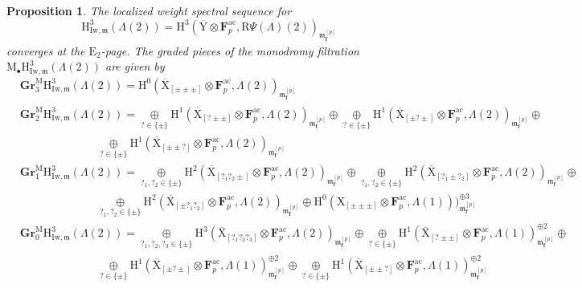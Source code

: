 \documentclass[10pt]{amsart}
\numberwithin{equation}{section}
\theoremstyle{plain}
\newtheorem{proposition}[theorem]{Proposition}
\numberwithin{equation}{section}
\theoremstyle{definition}
\theoremstyle{remark}
\def\ac{\mathrm{ac}}
\def\frakm{\mathfrak{m}}
\def\ac{\mathrm{ac}}
\def\triplef{\underline{\mathbf{f}}}
\def\frakm{\mathfrak{m}}
\def\FF{\mathbf{F}}
\def\rmH{\mathrm{H}}
\def\rmE{\mathrm{E}}
\def\rmM{\mathrm{M}}
\def\rmX{\mathrm{X}}
\def\rmXbar{\overline{\rmX}}
\def\rmY{\mathrm{Y}}
\def\rmR{\mathrm{R}}
\newcommand{\Iw}{\mathrm{Iw}}
\newcommand{\Gr}{\mathbf{Gr}}
\begin{document}
\begin{proposition}\label{WS}
The localized weight spectral sequence for 
\begin{equation*}
\rmH^{3}_{\Iw,\frakm}(\Lambda(2))=\rmH^{3}(\overline{\rmY}\otimes\FF^{\ac}_{p}, \rmR\Psi(\Lambda)(2))_{\frakm^{[p]}_{\triplef}}
\end{equation*} 
converges at the $\rmE_{2}$-page. The graded pieces of the monodromy filtration $\rmM_{\bullet}\rmH^{3}_{\Iw,\frakm}(\Lambda(2))$ are given by
\begin{equation*}
\begin{aligned}
&\Gr^{\rmM}_{3}\rmH^{3}_{\Iw,\frakm}(\Lambda(2))=\rmH^{0}(\rmXbar_{[\pm\pm\pm]}\otimes\FF^{\ac}_{p}, \Lambda(2))_{\frakm^{[p]}_{\triplef}}\\
&\Gr^{\rmM}_{2}\rmH^{3}_{\Iw,\frakm}(\Lambda(2))=\underset{?\in\{\pm\}}\oplus\rmH^{1}(\rmXbar_{[?\pm\pm]}\otimes\FF^{\ac}_{p}, \Lambda(2))_{\frakm^{[p]}_{\triplef}}\oplus \underset{?\in\{\pm\}}\oplus\rmH^{1}(\rmXbar_{[\pm?\pm]}\otimes{\FF^{\ac}_{p}}, \Lambda(2))_{\frakm^{[p]}_{\triplef}}\oplus \\
&\phantom{aaaaaaaaaaaaa}\underset{?\in\{\pm\}}\oplus\rmH^{1}(\rmXbar_{[\pm\pm?]}\otimes{\FF^{\ac}_{p}}, \Lambda(2))_{\frakm^{[p]}_{\triplef}} \\
&\Gr^{\rmM}_{1}\rmH^{3}_{\Iw,\frakm}(\Lambda(2))=\underset{?_{1}, ?_{2}\in\{\pm\}}\oplus\rmH^{2}(\rmXbar_{[?_{1}?_{2}\pm]}\otimes{\FF^{\ac}_{p}}, \Lambda(2))_{\frakm^{[p]}_{\triplef}}\oplus \underset{?_{1}, ?_{2}\in\{\pm\}}\oplus\rmH^{2}(\rmXbar_{[?_{1}\pm?_{2}]}\otimes{\FF^{\ac}_{p}}, \Lambda(2))_{\frakm^{[p]}_{\triplef}}\oplus\\
&\phantom{aaaaaaaaaaaaa}\underset{?_{1}, ?_{2}\in\{\pm\}}\oplus\rmH^{2}(\rmXbar_{[\pm?_{1}?_{2}]}\otimes{\FF^{\ac}_{p}}, \Lambda(2))_{\frakm^{[p]}_{\triplef}}\oplus\rmH^{0}(\rmX_{[\pm\pm\pm]}\otimes\FF^{\ac}_{p}, \Lambda(1)))^{\oplus 3}_{\frakm^{[p]}_{\triplef}} \\
&\Gr^{\rmM}_{0}\rmH^{3}_{\Iw,\frakm}(\Lambda(2))=\underset{?_{1}, ?_{2}, ?_{3}\in\{\pm\}}\oplus\rmH^{3}(\rmXbar_{[?_{1}?_{2}?_{3}]}\otimes{\FF^{\ac}_{p}}, \Lambda(2))_{\frakm^{[p]}_{\triplef}}\oplus \underset{?\in\{\pm\}}\oplus\rmH^{1}(\rmXbar_{[?\pm\pm]}\otimes{\FF^{\ac}_{p}}, \Lambda(1))^{\oplus2}_{\frakm^{[p]}_{\triplef}}\oplus\\
&\phantom{aaaaaaaaaaaaa}\underset{?\in\{\pm\}}\oplus\rmH^{1}(\rmXbar_{[\pm?\pm]}\otimes{\FF^{\ac}_{p}}, \Lambda(1))^{\oplus2}_{\frakm^{[p]}_{\triplef}}\oplus\underset{?\in\{\pm\}}\oplus\rmH^{1}(\rmXbar_{[\pm\pm?]}\otimes{\FF^{\ac}_{p}}, \Lambda(1))^{\oplus2}_{\frakm^{[p]}_{\triplef}}\\

\end{aligned}
\end{equation*}
\end{proposition}
\end{document}
